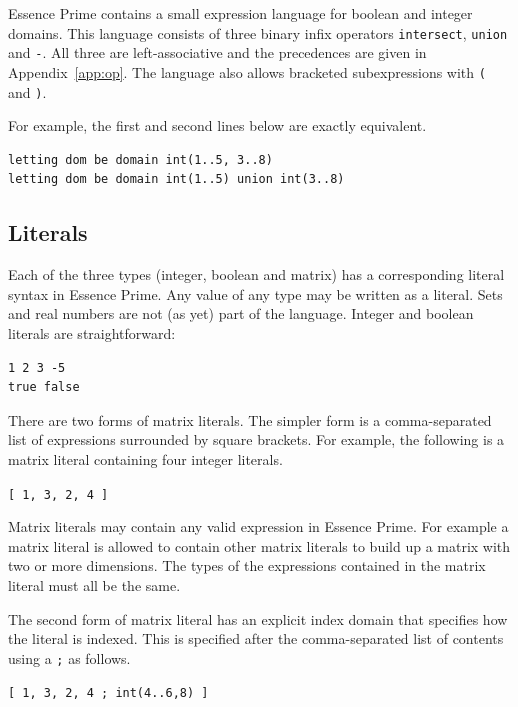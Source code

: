 \documentclass[a4paper]{article}
\newcommand{\eprime}{{\sc Essence Prime}\xspace}
\begin{document}
\eprime contains a small expression language for boolean and integer domains. 
This language consists of three binary infix operators \texttt{intersect}, \texttt{union} and \texttt{-}.
All three are left-associative and the precedences are given in Appendix~\ref{app:op}.
The language also allows bracketed subexpressions with \texttt{(} and \texttt{)}. 

For example, the first and second lines below are exactly equivalent. 

\begin{verbatim}
letting dom be domain int(1..5, 3..8)
letting dom be domain int(1..5) union int(3..8)
\end{verbatim}

\subsection{Literals}\label{sec:literals}

Each of the three types (integer, boolean and matrix) has a corresponding literal 
syntax in \eprime. Any value of any type may be written as a literal. Sets and 
real numbers are not (as yet) part of the language.  Integer and boolean literals
are straightforward:

\begin{center}
\begin{verbatim}
1 2 3 -5
true false
\end{verbatim}
\end{center}

There are two forms of matrix literals. The simpler form is a comma-separated list of
expressions surrounded by square brackets. For example, the following is a matrix
literal containing four integer literals. 

\begin{center}
{\tt [ 1, 3, 2, 4 ]}
\end{center}

Matrix literals may contain any valid expression in \eprime. For example a
matrix literal is allowed to contain other matrix literals to build up a matrix 
with two or more dimensions. The types of the expressions contained in the matrix
literal must all be the same. 

The second form of matrix literal has an explicit index domain that specifies how 
the literal is indexed. This is specified after the comma-separated list of
contents using a \texttt{;} as follows.

\begin{center}
{\tt [ 1, 3, 2, 4 ; int(4..6,8) ]}
\end{center}
\end{document}
